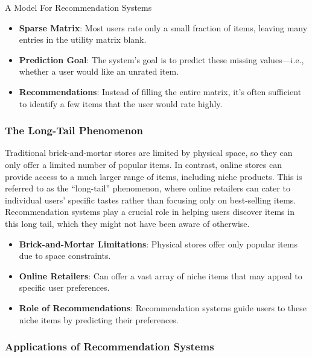 \begin{notes}{A Model For Recommendation Systems}
    \begin{highlight}
        \begin{itemize}
            \item \textbf{Sparse Matrix}: Most users rate only a small fraction of items, leaving many entries in the utility matrix blank.
            \item \textbf{Prediction Goal}: The system's goal is to predict these missing values—i.e., whether a user would like an unrated item.
            \item \textbf{Recommendations}: Instead of filling the entire matrix, it's often sufficient to identify a few items that the user would rate highly.
        \end{itemize}
    \end{highlight}
    
    \subsubsection*{The Long-Tail Phenomenon}
    
    Traditional brick-and-mortar stores are limited by physical space, so they can only offer a limited number of popular items. In contrast, online stores can provide access to a much larger range of items, including 
    niche products. This is referred to as the “long-tail” phenomenon, where online retailers can cater to individual users' specific tastes rather than focusing only on best-selling items. Recommendation systems 
    play a crucial role in helping users discover items in this long tail, which they might not have been aware of otherwise.
    
    \begin{highlight}
        \begin{itemize}
            \item \textbf{Brick-and-Mortar Limitations}: Physical stores offer only popular items due to space constraints.
            \item \textbf{Online Retailers}: Can offer a vast array of niche items that may appeal to specific user preferences.
            \item \textbf{Role of Recommendations}: Recommendation systems guide users to these niche items by predicting their preferences.
        \end{itemize}
    \end{highlight}
    
    \subsubsection*{Applications of Recommendation Systems}
    

\end{notes}

